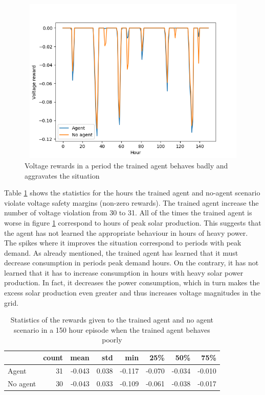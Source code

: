 \documentclass[class=book, crop=false]{standalone}
\begin{document}
\begin{figure}[H]
    \center
\includegraphics[height=8cm, width=12cm]{figures/config1_150hour_bad_voltage.png}
    \caption[size = 9]{Voltage rewards in a period the trained agent behaves badly and aggravates the situation}
    \label{fig:results:config1_150hour_bad_voltage}
\end{figure}
Table \ref{table:results:config1_150hour_bad_voltage} shows the statistics for the hours the trained agent and no-agent scenario violate voltage safety margins (non-zero rewards). The trained agent increase the number of voltage violation from 30 to 31. All of the times the trained agent is worse in figure \ref{fig:results:config1_150hour_bad_voltage} correspond to hours of peak solar production. This suggests that the agent has not learned the appropriate behaviour in hours of heavy power. The spikes where it improves the situation correspond to periods with peak demand. As already mentioned, the trained agent has learned that it must decrease consumption in periods peak demand hours. On the contrary, it has not learned that it has to increase consumption in hours with heavy solar power production. In fact, it decreases the power consumption, which in turn makes the excess solar production even greater and thus increases voltage magnitudes in the grid.  

\begin{table}[ht]
\center
\begin{tabular}{l|rrrrrrr}
         & count  & mean   & std   & min    & 25\%   & 50\%   & 75\%   \\
\hline
Agent    & 31    & -0.043 & 0.038 & -0.117 & -0.070 & -0.034 & -0.010 \\
No agent & 30    & -0.043 & 0.033 & -0.109 & -0.061 & -0.038 & -0.017 \\
\hline
\end{tabular}
\caption{Statistics of the rewards given to the trained agent and no agent scenario in a 150 hour episode when the trained agent behaves poorly}
\label{table:results:config1_150hour_bad_voltage}
\end{table}
\end{document}
